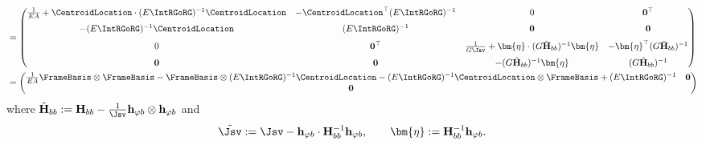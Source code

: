 \begin{equation*}
\begin{aligned}
&=\begin{pmatrix}
\frac{1}{EA} + \CentroidLocation\cdot (E\IntRGoRG)^{-1}\CentroidLocation & -\CentroidLocation^\top (E\IntRGoRG)^{-1} & 0 & \mathbf{0}^\top \\[6pt]
-(E\IntRGoRG)^{-1}\CentroidLocation & (E\IntRGoRG)^{-1} & \mathbf{0} & \mathbf{0} \\[6pt]
0 & \mathbf{0}^\top & \frac{1}{G\Jsv} + \bm{\eta}\cdot(G\tilde{\mathbf{H}}_{bb})^{-1}\bm{\eta} 
& -\bm{\eta}^\top(G\tilde{\mathbf{H}}_{bb})^{-1} \\[6pt]
\mathbf{0} & \mathbf{0} & -(G\tilde{\mathbf{H}}_{bb})^{-1}\bm{\eta} & (G\tilde{\mathbf{H}}_{bb})^{-1}
\end{pmatrix} 
\\
&= \begin{pmatrix}
\frac{1}{EA}\FrameBasis\otimes\FrameBasis - \FrameBasis\otimes(E\IntRGoRG)^{-1}\CentroidLocation-(E\IntRGoRG)^{-1}\CentroidLocation\otimes\FrameBasis + (E\IntRGoRG)^{-1} & \mathbf{0}\\
    \mathbf{0} & 
\end{pmatrix}
\end{aligned}
\end{equation*}
where $\tilde{\mathbf{H}}_{bb} := \mathbf{H}_{bb} - \frac{1}{\Jsv}\mathbf{h}_{\varphi b}\otimes\mathbf{h}_{\varphi b}$ 
and
\begin{equation}
\tilde{\Jsv} := \Jsv - \mathbf{h}_{\varphi b}\cdot \mathbf{H}_{bb}^{-1} \mathbf{h}_{\varphi b}, 
\qquad 
\bm{\eta} := \mathbf{H}_{bb}^{-1} \mathbf{h}_{\varphi b}.
\label{eq:reduced-torsion}
\end{equation}

